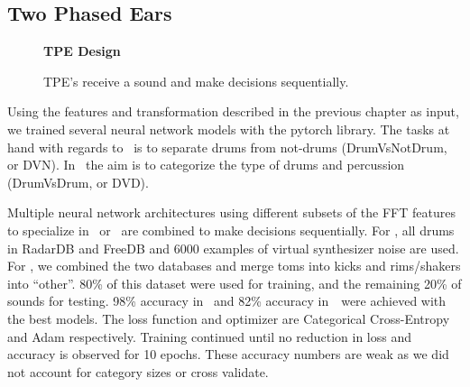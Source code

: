 \documentclass[\main/thesis.tex]{subfiles}
\begin{document}
\subsection{Two Phased Ears}
\begin{figure}[t!]
    \begin{center}
    \textbf{TPE Design}
    \end{center}
    \caption{TPE's receive a sound and make decisions sequentially.}
\label{fig:TPE_design}
\end{figure}


\label{TPE_models}
Using the features and transformation described in the previous chapter as input, we trained several neural network models with the pytorch library. The tasks at hand with regards to \decfirst~is to separate drums from not-drums (DrumVsNotDrum, or DVN). In \decsecond~the aim is to categorize the type of drums and percussion (DrumVsDrum, or DVD). 

 Multiple neural network architectures using different subsets of the FFT features to specialize in \decfirst~or \decsecond~are combined to make decisions sequentially. For \decfirst, all drums in RadarDB and FreeDB and 6000 examples of virtual synthesizer noise are used. For \decsecond, we combined the two databases and merge toms into kicks and rims/shakers into \enquote{other}. 80\% of this dataset were used for training, and the remaining 20\% of sounds for testing. 98\% accuracy in \decfirst~and 82\% accuracy in~\decsecond~were achieved with the best models. The loss function and optimizer are Categorical Cross-Entropy and Adam respectively. Training continued until no reduction in loss and accuracy is observed for 10 epochs. These accuracy numbers are weak as we did not account for category sizes or cross validate.  
\end{document}
